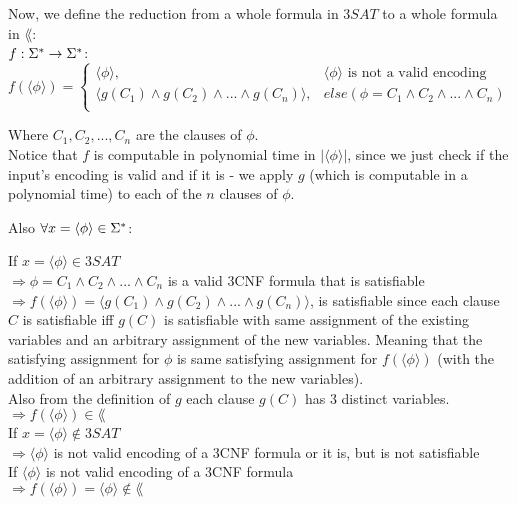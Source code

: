 Now, we define the reduction from a whole formula in $3SAT$ to a whole formula in $\lang$: \\
$f: \Sigma^* \rightarrow \Sigma^*$: \\
$
    f(\langle \phi \rangle) =
    \begin{cases}
        \langle \phi  \rangle,                                         & \langle \phi \rangle \text{ is not a valid encoding } \\
        \langle g(C_1) \wedge g(C_2) \wedge ... \wedge g(C_n) \rangle, & else (\phi = C_1 \wedge C_2 \wedge ... \wedge C_n)    \\
    \end{cases}
$

Where $C_1, C_2,...,C_n$ are the clauses of $\phi$. \\
Notice that $f$ is computable in polynomial time in $|\langle \phi \rangle|$, since we just check
if the input's encoding is valid and if it is - we apply $g$ (which is computable in a polynomial time) to each of the $n$ clauses of $\phi$.

Also $\forall x = \langle \phi \rangle \in \Sigma^*$:

If $x = \langle \phi \rangle \in 3SAT$ \\
$\Rightarrow \phi = C_1 \wedge C_2 \wedge ... \wedge C_n$ is a valid 3CNF formula that is satisfiable \\
$\Rightarrow f(\langle \phi \rangle) = \langle g(C_1) \wedge g(C_2) \wedge ... \wedge g(C_n) \rangle$,
is satisfiable since each clause $C$ is satisfiable iff $g(C)$ is satisfiable with same assignment of the
existing variables and an arbitrary assignment of the new variables. Meaning that the satisfying assignment
for $\phi$ is same satisfying assignment for $f(\langle \phi \rangle)$ (with the addition of an arbitrary
assignment to the new variables). \\
Also from the definition of $g$ each clause $g(C)$ has 3 distinct variables. \\
$\Rightarrow f(\langle \phi \rangle) \in \lang$ \\

If $x = \langle \phi \rangle \notin 3SAT$ \\
$\Rightarrow \langle  \phi \rangle$ is not valid encoding of a 3CNF formula or it is, but is not satisfiable \\

If $\langle \phi \rangle$ is not valid encoding of a 3CNF formula \\
$\Rightarrow f(\langle \phi \rangle) = \langle \phi \rangle \notin \lang$ \\

